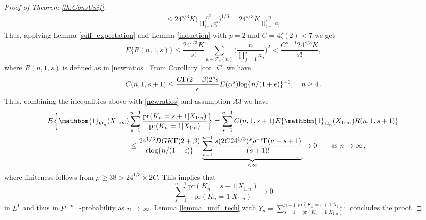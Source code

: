 \documentclass[12pt]{article}
\def\log{\hbox{log}}
\begin{document}
\begin{proof}[Proof of Theorem \ref{th:ConsUnif}]
\begin{align*}
\le 24^{s/3} K  \bigg(\frac{n^3}{\prod_{j=1}^{s} a_i^3} \bigg)^{1/3} = 24^{s/3} K  \frac{n}{\prod_{j=1}^{s} a_j}.
\end{align*}
Thus, applying Lemma \ref{suff_expectation} and Lemma \ref{induction} with $p=2$ and $C=4 \zeta(2) < 7$ we get
\begin{equation*}
E\{R(n,1,s)\} \le \frac{24^{s/3} K}{s!} \sum_{\bm{a} \in \mathcal{F}_s(n)} \bigg(\frac{n}{\prod_{j=1}^s a_j} \bigg)^2 < \frac{C^{s-1} 24^{s/3} K}{s!},
\end{equation*}
where $R(n,1,s)$ is defined as in \eqref{newratios}. From Corollary \ref{cor_C} we have
\[
C(n,1,s+1) \leq \frac{G\Gamma(2+\beta)2^ss}{\epsilon}E(\alpha^s)\log\{n/(1+\epsilon)\}^{-1}, \quad n \geq 4\,.
\]
Thus, combining the inequalities above with \eqref{newratios} and assumption $A3$ we have
\[
\begin{aligned}
E \biggl\{\mathbbm{1}_{\Omega_n}(X_{1:\infty})&\sum_{s = 1}^{n-1}\frac{\text{pr}(K_n = s+1 | X_{1:n})}{\text{pr}(K_n = 1 | X_{1:n})}\biggr\} = \sum_{s = 1}^{n-1}C(n,1,s+1)E\{\mathbbm{1}_{\Omega_n}(X_{1:\infty})R(n,1,s+1)\}\\
&  \leq \frac{24^{1/3}DGK\Gamma(2+\beta)}{\epsilon \log\{n/(1+\epsilon)\}}\underbrace{\sum_{ s = 1}^{n-1}\frac{s (2C24^{1/3})^{s}\rho^{-s}\Gamma(\nu +s+1)}{(s+1)!}}_{< \infty} \to 0\qquad\hbox{as }n\to\infty\,,
\end{aligned}
\]
where finiteness follows from  $\rho \ge 38 > 24^{1/3} \times 2C$. This implies that
\begin{equation*}
\sum_{s = 1}^{n-1}\frac{\text{pr}(K_n = s+1 | X_{1:n})}{\text{pr}(K_n = 1 | X_{1:n})} \rightarrow 0
\end{equation*}
in $L^1$ and thus in $P^{(\infty)}$-probability as $n\to\infty$. Lemma \ref{lemma_unif_tech} with $Y_n = \sum_{s = 1}^{n-1}\frac{\text{pr}(K_n = s+1 | X_{1:n})}{\text{pr}(K_n = 1 | X_{1:n})}$ concludes the proof.
\end{proof}
\end{document}
